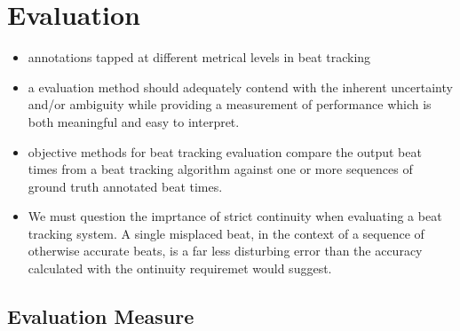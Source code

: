 \documentclass{scrartcl}
\begin{document}



\newpage
\section{Evaluation}


\begin{itemize}
\item annotations tapped at different metrical levels in beat tracking
\item a evaluation method should adequately contend with the inherent uncertainty and/or ambiguity while providing a measurement of performance which is both meaningful and easy to interpret. \cite{Davies2009b}
\item objective methods for beat tracking evaluation compare the output beat times from a beat tracking algorithm against one or more sequences of ground truth annotated beat times. \cite{Davies2009b}
\item We must question the imprtance of strict continuity when evaluating a beat tracking system. A single misplaced beat, in the context of a sequence of otherwise accurate beats, is a far less disturbing error than the accuracy calculated with the ontinuity requiremet would suggest. 
\end{itemize}


\subsection{Evaluation Measure}
\end{document}
